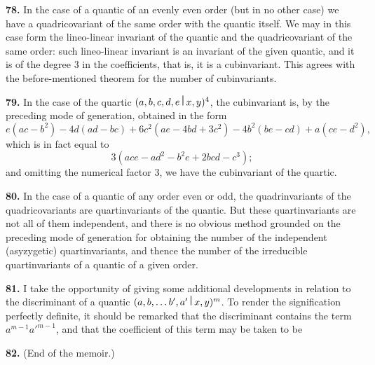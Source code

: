 \documentclass[12pt,a4paper]{article}
\theoremstyle{definition}
\begin{document}
\medskip
\noindent\textbf{78.} In the case of a quantic of an evenly even order (but in no other case) we have a quadricovariant of the same order with the quantic itself. We may in this case form the lineo-linear invariant of the quantic and the quadricovariant of the same order: such lineo-linear invariant is an invariant of the given quantic, and it is of the degree 3 in the coefficients, that is, it is a cubinvariant. This agrees with the before-mentioned theorem for the number of cubinvariants.

\medskip
\noindent\textbf{79.} In the case of the quartic $(a,b,c,d,e\,\raisebox{0.5ex}{\textbf{\textbar}}\,x,y)^4$, the cubinvariant is, by the preceding mode of generation, obtained in the form
\[e(ac-b^2) - 4d(ad-bc) + 6c^2(ae-4bd+3c^2) - 4b^2(be-cd) + a(ce-d^2),\]
which is in fact equal to
\[3(ace - ad^2 - b^2e + 2bcd - c^3);\]
and omitting the numerical factor 3, we have the cubinvariant of the quartic.

\medskip
\noindent\textbf{80.} In the case of a quantic of any order even or odd, the quadrinvariants of the quadricovariants are quartinvariants of the quantic. But these quartinvariants are not all of them independent, and there is no obvious method grounded on the preceding mode of generation for obtaining the number of the independent (asyzygetic) quartinvariants, and thence the number of the irreducible quartinvariants of a quantic of a given order.

\medskip
\noindent\textbf{81.} I take the opportunity of giving some additional developments in relation to the discriminant of a quantic $(a,b,\ldots b',a'\,\raisebox{0.5ex}{\textbf{\textbar}}\,x,y)^m$. To render the signification perfectly definite, it should be remarked that the discriminant contains the term $a^{m-1}a'^{m-1}$, and that the coefficient of this term may be taken to be

\newpage

\medskip
\noindent\textbf{82.} (End of the memoir.)
\end{document}
